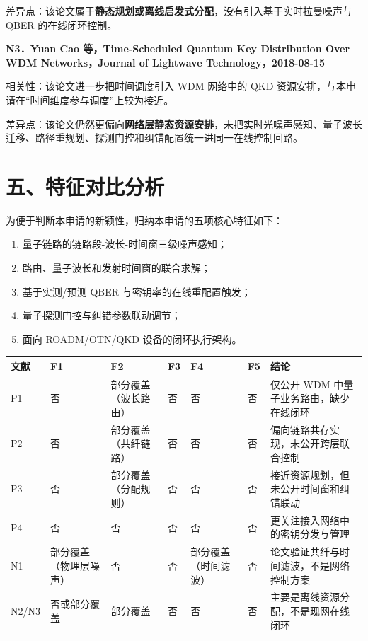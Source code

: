 \documentclass[12pt,a4paper]{article}
\begin{document}
差异点：该论文属于\textbf{静态规划或离线启发式分配}，没有引入基于实时拉曼噪声与 QBER 的在线闭环控制。

\vspace{0.5em}
\textbf{N3．Yuan Cao 等，Time-Scheduled Quantum Key Distribution Over WDM Networks，Journal of Lightwave Technology，2018-08-15}

相关性：该论文进一步把时间调度引入 WDM 网络中的 QKD 资源安排，与本申请在“时间维度参与调度”上较为接近。

差异点：该论文仍然更偏向\textbf{网络层静态资源安排}，未把实时光噪声感知、量子波长迁移、路径重规划、探测门控和纠错配置统一进同一在线控制回路。

\section*{五、特征对比分析}

为便于判断本申请的新颖性，归纳本申请的五项核心特征如下：
\begin{enumerate}[label=F\arabic*.]
    \item 量子链路的链路段-波长-时间窗三级噪声感知；
    \item 路由、量子波长和发射时间窗的联合求解；
    \item 基于实测/预测 QBER 与密钥率的在线重配置触发；
    \item 量子探测门控与纠错参数联动调节；
    \item 面向 ROADM/OTN/QKD 设备的闭环执行架构。
\end{enumerate}

\renewcommand{\arraystretch}{1.3}
\small
\setlength{\tabcolsep}{3pt}
\begin{tabularx}{\textwidth}{|L{1.1cm}|L{1.55cm}|L{1.55cm}|L{1.55cm}|L{1.55cm}|L{1.55cm}|X|}
\hline
\textbf{文献} & \textbf{F1} & \textbf{F2} & \textbf{F3} & \textbf{F4} & \textbf{F5} & \textbf{结论} \\
\hline
P1 & 否 & 部分覆盖（波长路由） & 否 & 否 & 否 & 仅公开 WDM 中量子业务路由，缺少在线闭环 \\
\hline
P2 & 否 & 部分覆盖（共纤链路） & 否 & 否 & 否 & 偏向链路共存实现，未公开跨层联合控制 \\
\hline
P3 & 否 & 部分覆盖（分配规则） & 否 & 否 & 否 & 接近资源规划，但未公开时间窗和纠错联动 \\
\hline
P4 & 否 & 否 & 否 & 否 & 否 & 更关注接入网络中的密钥分发与管理 \\
\hline
N1 & 部分覆盖（物理层噪声） & 否 & 否 & 部分覆盖（时间滤波） & 否 & 论文验证共纤与时间滤波，不是网络控制方案 \\
\hline
N2/N3 & 否或部分覆盖 & 部分覆盖 & 否 & 否 & 否 & 主要是离线资源分配，不是现网在线闭环 \\
\hline
\end{tabularx}
\normalsize
\setlength{\tabcolsep}{6pt}
\end{document}
